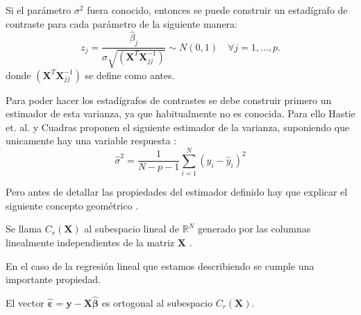 \noindent Si el parámetro $\sigma^2$ fuera conocido, entonces se puede construir un estadígrafo de contraste para cada parámetro de la siguiente manera: 
\begin{equation}
z_j=\dfrac{\hat{\beta}_j}{\sigma \sqrt{(\mathbf{X}^T\mathbf{X}_{jj}^{-1})}}\sim N(0,1)\quad\forall j=1,\ldots, p.
\end{equation}
\noindent donde $(\mathbf{X}^T\mathbf{X}_{jj}^{-1})$ se define como antes. 

\noindent Para poder hacer los estadígrafos de contrastes se debe construir primero un estimador de esta varianza, ya que habitualmente no es conocida. Para ello Hastie et. al. y Cuadras proponen el siguiente estimador de la varianza, suponiendo que unicamente hay una variable respuesta \cite{Cuadras 2014, Hastie 2001}: 
\begin{equation}
\hat{\sigma}^2=\dfrac{1}{N-p-1}\sum_{i=1}^N (y_i-\hat{y}_i)^2 
\end{equation} 

\noindent Pero antes de detallar las propiedades del estimador definido hay que explicar el siguiente concepto geométrico \cite{Cuadras 2014}. 
\begin{defi}
Se llama  $C_{r}(\mathbf{X})$ al subespacio lineal de $\mathbb{R}^{N}$ generado por las columnas linealmente independientes de la matriz $\mathbf{X}$ .
\end{defi}

\noindent En el caso de la regresión lineal que estamos describiendo se cumple una importante propiedad. 
\begin{propo}\label{prop ort}
El vector $\hat{\mathbf{\varepsilon}}=\mathbf{y}-\mathbf{X\hat{\beta}}$ es ortogonal al subespacio $C_{r}(\mathbf{X})$.
\end{propo}

